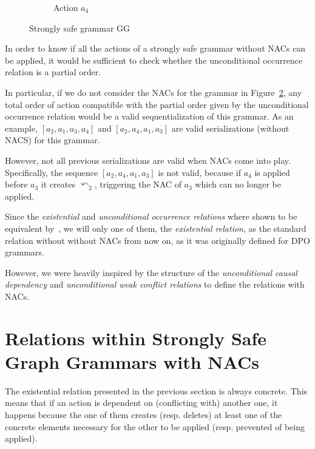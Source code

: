 \begin{example}
\begin{figure}[!ht]
\begin{subfigure}[t]{.2\textwidth}
    \caption{Action $a_4$}\label{fig:process:unconditional-relation:a4}
  \end{subfigure}
  \caption{Strongly safe grammar GG}\label{fig:process:unconditional-relation}
\end{figure}

  In order to know if all the actions of a strongly safe grammar without NACs can be applied, it would be sufficient to check whether the unconditional occurrence relation is a partial order.

  In particular, if we do not consider the NACs for the grammar in Figure~\ref{fig:process:unconditional-relation}, any total order of action compatible with the partial order given by the unconditional occurrence relation would be a valid sequentialization of this grammar. As an example, $[a_2, a_1, a_3, a_4]$ and $[a_2, a_4, a_1, a_3]$ are valid serializations (without NACS) for this grammar. 
  
  However, not all previous serializations are valid when NACs come into play. Specifically, the sequence $[a_2, a_4, a_1, a_3]$ is not valid, because if $a_4$ is applied before $a_3$ it creates $\curvearrowleft_2$, triggering the NAC of $a_3$ which can no longer be applied.

\end{example}

\begin{remark} Since the \emph{existential} and \emph{unconditional occurrence relations} where shown to be equivalent by~\cite{Ribeiro1996}, we will only one of them, the \emph{existential relation}, as the standard relation without without NACs from now on, as it was originally defined for DPO grammars.

  However, we were heavily inspired by the structure of the \emph{unconditional causal dependency} and \emph{unconditional weak conflict relations} to define the relations with NACs.
\end{remark}

\section{Relations within Strongly Safe Graph Grammars with NACs}

The existential relation presented in the previous section is always concrete. This means that if an action is dependent on (conflicting with) another one, it happens because the one of them creates (resp. deletes) at least one of the concrete elements necessary for the other to be applied (resp. prevented of being applied).


